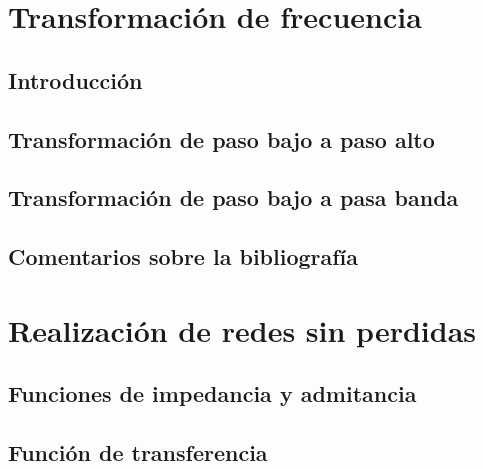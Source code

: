 \documentclass[oneside,a4paper,10pt]{scrbook}
\begin{document}
    \chapter{Transformación de frecuencia}
	{
		\section{Introducción}
   		{
    				
		}
		
		\clearpage	
		
		\section{Transformación de paso bajo a paso alto}
   		{
    				
		}
		
		\clearpage
		
		\section{Transformación de paso bajo a pasa banda}
   		{
    				
		}
		
		\clearpage
		
		\section{Comentarios sobre la bibliografía}
   		{
    						
		}		
		
	}
	
	\clearpage
	
    \chapter{Realización de redes sin perdidas}{
    
    	\section{Funciones de impedancia y admitancia}	
 	   {
    	}\newpage
    
		\section{Función de transferencia}	
		{
	   }\newpage    
   
    }
    
    \clearpage
        
\end{document}
